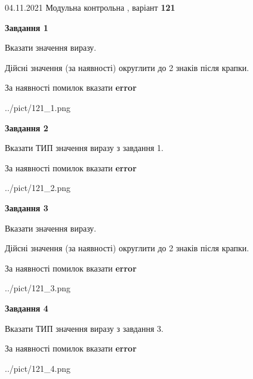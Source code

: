 \documentclass[11pt, ukrainian]{article}
\begin{document}
{04.11.2021 Модульна контрольна , варіант  \No \textbf { 121 }\par}
{
\begin {large}
{\begin {center}\textbf{Завдання 1}\end {center}}\par
Вказати значення виразу. \par
Дійсні значення (за наявності) округлити до 2 знаків після крапки. \par
За наявності помилок вказати \textbf{error}

\begin{center}
	{../pict/121_1.png}
\end{center}
\newpage

{\begin {center}\textbf{Завдання 2}\end {center}}\par
Вказати ТИП значення виразу з завдання 1. \par
За наявності помилок вказати \textbf{error}

\begin{center}
	{../pict/121_2.png}
\end{center}
\newpage

{\begin {center}\textbf{Завдання 3}\end {center}}\par
Вказати значення виразу. \par
Дійсні значення (за наявності) округлити до 2 знаків після крапки. \par
За наявності помилок вказати \textbf{error}

\begin{center}
	{../pict/121_3.png}
\end{center}
\newpage

{\begin {center}\textbf{Завдання 4}\end {center}}\par
Вказати ТИП значення виразу з завдання 3. \par
За наявності помилок вказати \textbf{error}

\begin{center}
	{../pict/121_4.png}
\end{center}
\newpage


\end{large}}
\end{document}
